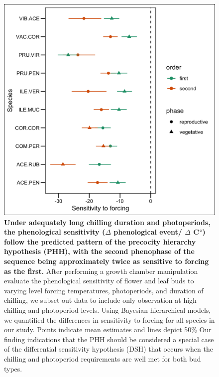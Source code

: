 \documentclass[11pt]{article}
\begin{document}
\begin{figure}[h!]
    \centering
         \includegraphics[width=.8\textwidth]{..//Plots/Flobuds_manuscript_figs/phh_plot.png}
    \caption{\textbf{Under adequately long chilling duration and photoperiods, the phenological sensitivity ($\Delta$ phenological event/ $\Delta$ C$\degree$) follow the predicted pattern of the precocity hierarchy hypothesis (PHH), with the second phenophase of the sequence being approximately twice as sensitive to forcing as the first.} After performing a growth chamber manipulation evaluate the phenological sensitivity of flower and leaf buds to varying level forcing temperatures, photoperiods, and duration of chilling, we subset out data to include only observation at high chilling and photoperiod levels. Using Bayesian hierarchical models, we quantified the differences in sensitivity to forcing for all species in our study. Points indicate mean estimates and lines depict 50\% Our finding indications that the PHH should be considered a special case of the differential sensitivity hypothesis (DSH) that occurs when the chilling and photoperiod requirements are well met for both bud types.}
    \label{fig:phh}
\end{figure}
\end{document}
